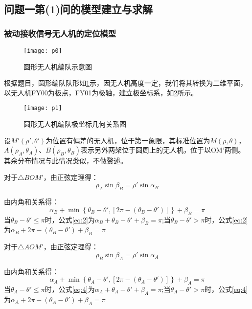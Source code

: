 \documentclass{cumcmthesis}
\begin{document}
\subsection{问题一第(1)问的模型建立与求解}
\subsubsection{被动接收信号无人机的定位模型}
\begin{figure}[!h]
	\centering
	\texttt{[image: p0]}
	\caption{圆形无人机编队示意图}
	\label{fig:p0}
\end{figure}
根据题目，圆形编队队形如\cref{fig:p0}示，因无人机高度一定，我们将其转换为二维平面，以无人机FY00为极点，FY01为极轴，建立极坐标系，如\cref{fig:p1}所示。
\begin{figure}[!h]
	\centering
	\texttt{[image: p1]}
	\caption{圆形无人机编队极坐标几何关系图}
	\label{fig:p1}
\end{figure}
	设$M'(\rho',\theta')$为位置有偏差的无人机，位于第一象限，其标准位置为$M(\rho,\theta)$，$A(\rho_A,\theta_A)$、$B(\rho_B,\theta_B )$表示另外两架位于圆周上的无人机，位于以OM'两侧。其余分布情况与此情况类似，不做赘述。
	

对于$\triangle BOM'$，由正弦定理得：
	\begin{equation}
		\rho_{A} \sin\beta_{B} = \rho' \sin\alpha_{B}
		\label{eq:1}
	\end{equation}

由内角和关系得：
	\begin{equation}
	\alpha_{B}+ \min \left\{ \theta_{B} - \theta',\left[2\pi - (\theta_{B} - \theta') \right] \right\}    + \beta_{B} = \pi
	\label{eq:2}
	\end{equation}
当$\theta_{B} - \theta' \le \pi$时，公式\cref{eq:2}为$\alpha_{B}+  \theta_{B} - \theta'  + \beta_{B} = \pi$;当$\theta_{B} - \theta' > \pi$时，公式\cref{eq:2}为$\alpha_{B}+  2\pi - (\theta_{B} - \theta')  + \beta_{B} = \pi$

对于$\triangle AOM'$，由正弦定理得：
\begin{equation}
	\rho_{B} \sin\beta_{A} = \rho' \sin\alpha_{A}
	\label{eq:3}
\end{equation}

由内角和关系得：
\begin{equation}
	\alpha_{A}+ \min \left\{ \theta_{A} - \theta',\left[2\pi - (\theta_{A} - \theta') \right] \right\}    + \beta_{A} = \pi
	\label{eq:4}
\end{equation}
当$\theta_{A} - \theta' \le \pi$时，公式\cref{eq:4}为$\alpha_{A}+  \theta_{A} - \theta'  + \beta_{A} = \pi$;当$\theta_{A} - \theta' > \pi$时，公式\cref{eq:4}为$\alpha_{A}+  2\pi - (\theta_{A} - \theta')  + \beta_{A} = \pi$
\end{document}
